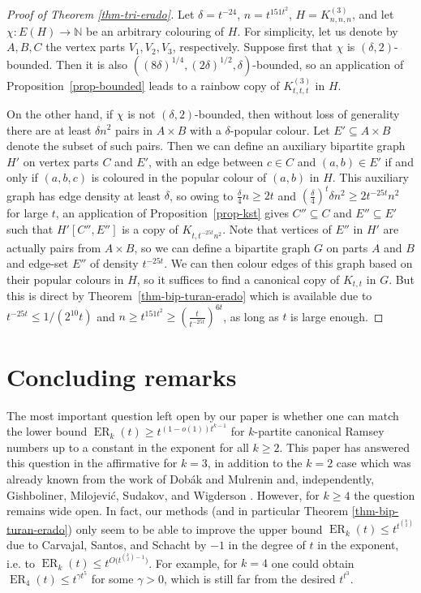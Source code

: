 \documentclass[10pt,a4paper]{article}
\theoremstyle{plain}
\theoremstyle{definition}
\newcommand{\N}{\mathbb{N}}
\newcommand{\erado}[2]{\operatorname{ER}_{#1}(#2)}
\newcommand{\bicmpltt}[2]{K_{#1,#2}}
\newcommand{\bicmplt}[1]{\bicmpltt{#1}{#1}}
\newcommand{\tricmplt}[1]{K^{(3)}_{#1,#1,#1}}
\begin{document}
\begin{proof}[Proof of Theorem \ref{thm-tri-erado}]\sloppy
    Let $\delta=t^{-24}$, $n=t^{151t^2}$, $H=\tricmplt{n}$, and let $\chi:E(H)\to\N$ be an arbitrary colouring of $H$. For simplicity, let us denote by $A,B,C$ the vertex parts $V_1,V_2,V_3$, respectively. Suppose first that $\chi$ is $(\delta,2)$-bounded. Then it is also $\left((8\delta)^{1/4},(2\delta)^{1/2},\delta\right)$-bounded, so an application of Proposition~\ref{prop-bounded} leads to a rainbow copy of $\tricmplt{t}$ in $H$.

    On the other hand, if $\chi$ is not $(\delta,2)$-bounded, then without loss of generality there are at least $\delta n^2$ pairs in $A\times B$ with a $\delta$-popular colour. Let $E'\subseteq A\times B$ denote the subset of such pairs. Then we can define an auxiliary bipartite graph $H'$ on vertex parts $C$ and $E'$, with an edge between $c\in C$ and $(a,b)\in E'$ if and only if $(a,b,c)$ is coloured in the popular colour of $(a,b)$ in $H$. This auxiliary graph has edge density at least $\delta$, so owing to $\frac{\delta}{4}n\ge 2t$ and $(\frac{\delta}{4})^t \delta n^2 \ge 2t^{-25t} n^2$ for large $t$, an application of Proposition~\ref{prop-kst} gives $C''\subseteq C$ and $E''\subseteq E'$ such that $H'[C'',E'']$ is a copy of $\bicmpltt{t}{t^{-25t}n^2}$. Note that vertices of $E''$ in $H'$ are actually pairs from $A \times B$, so we can define a bipartite graph $G$ on parts $A$ and $B$ and edge-set $E''$ of density $t^{-25t}$. We can then colour edges of this graph based on their popular colours in $H$, so it suffices to find a canonical copy of $\bicmplt{t}$ in $G$. But this is direct by Theorem~\ref{thm-bip-turan-erado} which is available due to $t^{-25t}\le 1/(2^{10}t)$ and $n\ge t^{151t^2}\ge (\frac{t}{t^{-25t}})^{6t}$, as long as $t$ is large enough.
\end{proof}


\section{Concluding remarks}\label{sec-concl}

The most important question left open by our paper is whether one can match the lower bound $\erado{k}{t}\ge t^{(1-o(1))t^{k-1}}$ for $k$-partite canonical Ramsey numbers up to a constant in the exponent for all $k\ge 2$. This paper has answered this question in the affirmative for $k=3$, in addition to the $k=2$ case which was already known from the work of Dob\'ak and Mulrenin \cite{dobak2026sharp} and, independently, Gishboliner, Milojevi\'c, Sudakov, and Wigderson \cite{gishboliner2025canonical}. However, for $k\ge 4$ the question remains wide open. In fact, our methods (and in particular Theorem \ref{thm-bip-turan-erado}) only seem to be able to improve the upper bound $\erado{k}{t}\le t^{t^{\binom{k}{2}}}$ due to Carvajal, Santos, and Schacht \cite{carvajal2024canonical} by $-1$ in the degree of $t$ in the exponent, i.e. to $\erado{k}{t}\le t^{O\big(t^{\binom{k}{2}-1}\big)}$. For example, for $k=4$ one could obtain $\erado{4}{t}\le t^{\gamma t^5}$ for some $\gamma>0$, which is still far from the desired $t^{t^3}$.
\end{document}
